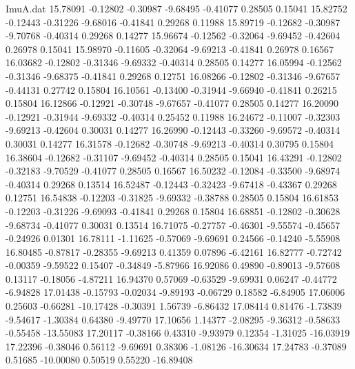 \begin{filecontents}{ImuA.dat}
  15.78091   -0.12802   -0.30987   -9.68495   -0.41077    0.28505    0.15041
  15.82752   -0.12443   -0.31226   -9.68016   -0.41841    0.29268    0.11988
  15.89719   -0.12682   -0.30987   -9.70768   -0.40314    0.29268    0.14277
  15.96674   -0.12562   -0.32064   -9.69452   -0.42604    0.26978    0.15041
  15.98970   -0.11605   -0.32064   -9.69213   -0.41841    0.26978    0.16567
  16.03682   -0.12802   -0.31346   -9.69332   -0.40314    0.28505    0.14277
  16.05994   -0.12562   -0.31346   -9.68375   -0.41841    0.29268    0.12751
  16.08266   -0.12802   -0.31346   -9.67657   -0.44131    0.27742    0.15804
  16.10561   -0.13400   -0.31944   -9.66940   -0.41841    0.26215    0.15804
  16.12866   -0.12921   -0.30748   -9.67657   -0.41077    0.28505    0.14277
  16.20090   -0.12921   -0.31944   -9.69332   -0.40314    0.25452    0.11988
  16.24672   -0.11007   -0.32303   -9.69213   -0.42604    0.30031    0.14277
  16.26990   -0.12443   -0.33260   -9.69572   -0.40314    0.30031    0.14277
  16.31578   -0.12682   -0.30748   -9.69213   -0.40314    0.30795    0.15804
  16.38604   -0.12682   -0.31107   -9.69452   -0.40314    0.28505    0.15041
  16.43291   -0.12802   -0.32183   -9.70529   -0.41077    0.28505    0.16567
  16.50232   -0.12084   -0.33500   -9.68974   -0.40314    0.29268    0.13514
  16.52487   -0.12443   -0.32423   -9.67418   -0.43367    0.29268    0.12751
  16.54838   -0.12203   -0.31825   -9.69332   -0.38788    0.28505    0.15804
  16.61853   -0.12203   -0.31226   -9.69093   -0.41841    0.29268    0.15804
  16.68851   -0.12802   -0.30628   -9.68734   -0.41077    0.30031    0.13514
  16.71075   -0.27757   -0.46301   -9.55574   -0.45657   -0.24926    0.01301
  16.78111   -1.11625   -0.57069   -9.69691    0.24566   -0.14240   -5.55908
  16.80485   -0.87817   -0.28355   -9.69213    0.41359    0.07896   -6.42161
  16.82777   -0.72742   -0.00359   -9.59522    0.15407   -0.34849   -5.87966
  16.92086    0.49890   -0.89013   -9.57608    0.13117   -0.18056   -4.87211
  16.94370    0.57069   -0.63529   -9.69931    0.06247   -0.44772   -6.94828
  17.01438   -0.15793   -0.02034   -9.89193   -0.06729    0.18582   -6.84905
  17.06006    0.25603   -0.66281  -10.17428   -0.30391    1.56739   -6.86432
  17.08414    0.81476   -1.73839   -9.54617   -1.30384    0.64380   -9.49770
  17.10656    1.14377   -2.08295   -9.36312   -0.58633   -0.55458  -13.55083
  17.20117   -0.38166    0.43310   -9.93979    0.12354   -1.31025  -16.03919
  17.22396   -0.38046    0.56112   -9.69691    0.38306   -1.08126  -16.30634
  17.24783   -0.37089    0.51685  -10.00080    0.50519    0.55220  -16.89408

\end{filecontents}
